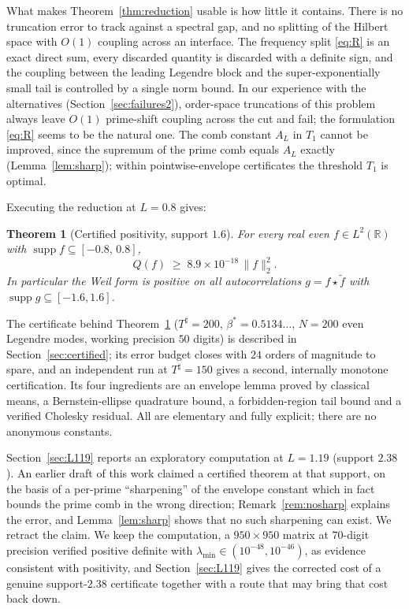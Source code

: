 ﻿\documentclass[11pt]{article}
\newtheorem{theorem}{Theorem}[section]
\newcommand{\R}{\mathbb{R}}
\newcommand{\supp}{\operatorname{supp}}
\newcommand{\lammin}{\lambda_{\min}}
\newcommand{\Tsharp}{T^{\sharp}}
\begin{document}
What makes Theorem~\ref{thm:reduction} usable is how little it
contains.  There is no truncation error to track against a spectral
gap, and no splitting of the Hilbert space with $O(1)$ coupling across
an interface.  The frequency split \eqref{eq:R} is an exact direct
sum, every discarded quantity is discarded with a definite sign, and
the coupling between the leading Legendre block and the
super-exponentially small tail is controlled by a single norm bound.
In our experience with the alternatives
(Section~\ref{sec:failures2}), order-space truncations of this problem
always leave $O(1)$ prime-shift coupling across the cut and fail; the
formulation \eqref{eq:R} seems to be the natural one.  The comb
constant $A_L$ in $T_1$ cannot be improved, since the supremum of the
prime comb equals $A_L$ exactly (Lemma~\ref{lem:sharp}); within
pointwise-envelope certificates the threshold $T_1$ is optimal.

Executing the reduction at $L=0.8$ gives:

\begin{theorem}[Certified positivity, support $1.6$]\label{thm:L08}
For every real even $f\in L^2(\R)$ with
$\supp f\subseteq[-0.8,\,0.8]$,
\[
Q(f)\;\ge\;8.9\times10^{-18}\,\|f\|_2^2 .
\]
In particular the Weil form is positive on all autocorrelations
$g=f\star\tilde f$ with $\supp g\subseteq[-1.6,1.6]$.
\end{theorem}

The certificate behind Theorem~\ref{thm:L08} ($\Tsharp=200$,
$\beta^*=0.5134\ldots$, $N=200$ even Legendre modes, working precision
$50$ digits) is described in Section~\ref{sec:certified}; its error
budget closes with $24$ orders of magnitude to spare, and an
independent run at $\Tsharp=150$ gives a second, internally monotone
certification.  Its four ingredients are an envelope lemma proved by
classical means, a Bernstein-ellipse quadrature bound, a
forbidden-region tail bound and a verified Cholesky residual.  All are
elementary and fully explicit; there are no anonymous constants.

Section~\ref{sec:L119} reports an exploratory computation at $L=1.19$
(support $2.38$).  An earlier draft of this work claimed a certified
theorem at that support, on the basis of a per-prime ``sharpening'' of
the envelope constant which in fact bounds the prime comb in the wrong
direction; Remark~\ref{rem:nosharp} explains the error, and
Lemma~\ref{lem:sharp} shows that no such sharpening can exist.  We
retract the claim.  We keep the computation, a $950\times950$ matrix at
$70$-digit precision verified positive definite with
$\lammin\in(10^{-48},10^{-46})$, as evidence consistent with
positivity, and Section~\ref{sec:L119} gives the corrected cost of a
genuine support-$2.38$ certificate together with a route that may
bring that cost back down.
\end{document}
